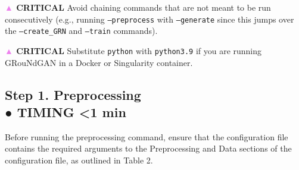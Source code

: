 \begin{tcolorbox}
\textbf{\textcolor{violet}{▲} CRITICAL} Avoid chaining commands that are not meant to be run consecutively (e.g., running
\texttt{--preprocess} with \texttt{--generate} since this jumps over the \texttt{--create\_GRN} and \texttt{--train}
commands). 


\textbf{\textcolor{violet}{▲} CRITICAL} Substitute \texttt{python} with \texttt{python3.9} if you are running GRouNdGAN in a Docker or
Singularity container. 


\subsection*{Step 1. Preprocessing\\● TIMING <1 min}
Before running the preprocessing command, ensure that the configuration file contains the
required arguments to the Preprocessing and Data sections of the configuration file, as outlined
in Table 2.


\end{tcolorbox}
